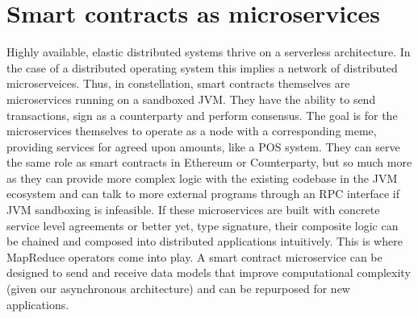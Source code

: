 \documentclass{article}
\begin{document}
\section{Smart contracts as microservices}
Highly available, elastic distributed systems thrive on a serverless architecture. In the case of a distributed operating system this implies a network of distributed microserveices. Thus, in constellation, smart contracts themselves are microservices running on a sandboxed JVM. They have the ability to send transactions, sign as a counterparty and perform consensus. The goal is for the microservices themselves to operate as a node with a corresponding meme, providing services for agreed upon amounts, like a POS system. They can serve the same role as smart contracts in Ethereum or Counterparty, but so much more as they can provide more complex logic with the existing codebase in the JVM ecosystem and can talk to more external programs through an RPC interface if JVM sandboxing is infeasible. If these microservices are built with concrete service level agreements or better yet, type signature, their composite logic can be chained and composed into distributed applications intuitively. This is where MapReduce operators come into play. A smart contract microservice can be designed to send and receive data models that improve computational complexity (given our asynchronous architecture) and can be repurposed for new applications.


\end{document}
